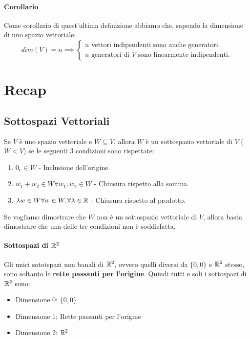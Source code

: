 \paragraph{Corollario} Come corollario di quest'ultima definizione abbiamo che, sapendo la dimensione di
uno spazio vettoriale:
$$dim(V)=n\implies
\begin{cases}
    n \text{ vettori indipendenti sono anche generatori.} \\
    n \text{ generatori di $V$ sono linearmente indipendenti.}
\end{cases}
$$

\section{Recap}
\subsection{Sottospazi Vettoriali}
Se $V$ è uno spazio vettoriale e $W\subseteq V$, allora $W$ è un sottospazio vettoriale di $V$ ($W<V$)
se le seguenti 3 condizioni sono rispettate:
\begin{enumerate}
    \item $0_v\in W$ - Inclusione dell'origine.
    \item $w_1 + w_2 \in W \forall w_1,w_2 \in W$ - Chiusura rispetto alla somma.
    \item $\lambda w \in W \forall w\in W, \forall \lambda \in \mathbb{R}$ - Chiusura rispetto al prodotto.
\end{enumerate}
Se vogliamo dimostrare che $W$ non è un sottospazio vettoriale di $V$, allora basta dimostrare che una delle tre condizioni non è soddisfatta.

\paragraph{Sottospazi di $\mathbb{R}^2$}
Gli unici sototspazi non banali di $\mathbb{R}^2$, ovvero quelli diversi da $\{0,0\}$ e $\mathbb{R}^2$ stesso, sono
soltanto le \textbf{rette passanti per l'origine}.
Quindi tutti e soli i sottospazi di $\mathbb{R}^2$ sono:
\begin{itemize}
    \item Dimensione 0: $\{0,0\}$
    \item Dimensione 1: Rette passanti per l'origine
    \item Dimensione 2: $\mathbb{R}^2$
\end{itemize}

